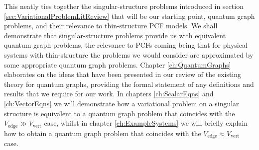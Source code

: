 This neatly ties together the singular-structure problems introduced in section \ref{sec:VariationalProblemLitReview} that will be our starting point, quantum graph problems, and their relevance to thin-structure PCF models.
We shall demonstrate that singular-structure problems provide us with equivalent quantum graph problems, the relevance to PCFs coming being that for physical systems with thin-structure the problems we would consider are approximated by some appropriate quantum graph problems.
Chapter \ref{ch:QuantumGraphs} elaborates on the ideas that have been presented in our review of the existing theory for quantum graphs, providing the formal statement of any definitions and results that we require for our work.
In chapters \ref{ch:ScalarEqns} and \ref{ch:VectorEqns} we will demonstrate how a variational problem on a singular structure is equivalent to a quantum graph problem that coincides with the $V_{\mathrm{edge}} \gg V_{\mathrm{vert}}$ case, whilst in chapter \ref{ch:ExampleSystems} we will briefly explain how to obtain a quantum graph problem that coincides with the $V_{\mathrm{edge}} \approx V_{\mathrm{vert}}$ case.

